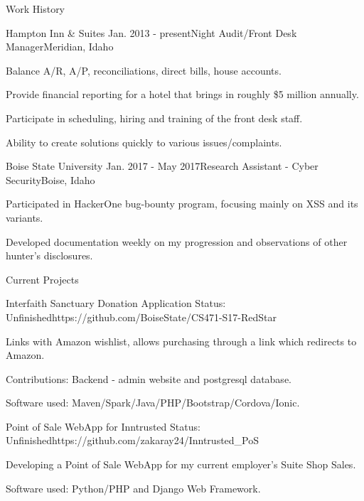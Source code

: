 \documentclass{resume}
\begin{document}
\begin{rSection}{Work History}

\begin{rSubsection}{Hampton Inn \& Suites}
{Jan. 2013 - present}{Night Audit/Front Desk Manager}{Meridian, Idaho}
\item Balance A/R, A/P, reconciliations, direct bills, house accounts.
\item Provide financial reporting for a hotel that brings in roughly \$5 million annually.
\item Participate in scheduling, hiring and training of the front desk staff. 
\item Ability to create solutions quickly to various issues/complaints. 
\end{rSubsection}

\begin{rSubsection}{Boise State University}
{Jan. 2017 - May 2017}{Research Assistant - Cyber Security}{Boise, Idaho}
\item Participated in HackerOne bug-bounty program, focusing mainly on XSS and its variants.
\item Developed documentation weekly on my progression and observations of other hunter's disclosures.
\end{rSubsection}  

\end{rSection}

\begin{rSection}{Current Projects}

\begin{rSubsection}{Interfaith Sanctuary Donation Application}
{Status: Unfinished}{https://github.com/BoiseState/CS471-S17-RedStar}{}
\item Links with Amazon wishlist, allows purchasing through a link which redirects to Amazon.
\item Contributions: Backend - admin website and postgresql database.
\item Software used: Maven/Spark/Java/PHP/Bootstrap/Cordova/Ionic.
\end{rSubsection}

\begin{rSubsection}{Point of Sale WebApp for Inntrusted}
{Status: Unfinished}{https://github.com/zakaray24/Inntrusted\_PoS}{}
\item Developing a Point of Sale WebApp for my current employer's Suite Shop Sales.
\item Software used: Python/PHP and Django Web Framework.
\end{rSubsection}

\end{rSection}
\end{document}
